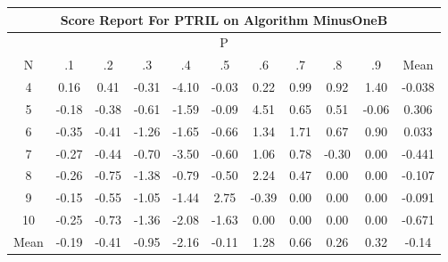 \documentclass[11pt,a4paper]{report}
\begin{document}
\begin{longtable}{ | c || c | c | c | c | c | c | c | c | c || c |}
\hline
\multicolumn{11}{|c|}{ Score Report For PTRIL on Algorithm MinusOneB} \\
\hline
\multicolumn{11}{|c|}{ P } \\
\hline
N & .1 & .2 & .3 & .4 & .5 & .6 & .7 & .8 & .9 & Mean\\
 \hline
 \hline
 \endhead
  4 &  \cellcolor[HTML]{FFFFFF} 0.16 &  \cellcolor[HTML]{F7F7FF} 0.41 &  \cellcolor[HTML]{FFF7F7} -0.31 &  \cellcolor[HTML]{FF9797} -4.10 &  \cellcolor[HTML]{FFFFFF} -0.03 &  \cellcolor[HTML]{F7F7FF} 0.22 &  \cellcolor[HTML]{E7E7FF} 0.99 &  \cellcolor[HTML]{E7E7FF} 0.92 &  \cellcolor[HTML]{DFDFFF} 1.40 & -0.038 \\
  5 &  \cellcolor[HTML]{FFF7F7} -0.18 &  \cellcolor[HTML]{FFF7F7} -0.38 &  \cellcolor[HTML]{FFEFEF} -0.61 &  \cellcolor[HTML]{FFD7D7} -1.59 &  \cellcolor[HTML]{FFFFFF} -0.09 &  \cellcolor[HTML]{8F8FFF} 4.51 &  \cellcolor[HTML]{EFEFFF} 0.65 &  \cellcolor[HTML]{EFEFFF} 0.51 &  \cellcolor[HTML]{FFFFFF} -0.06 & 0.306 \\
  6 &  \cellcolor[HTML]{FFF7F7} -0.35 &  \cellcolor[HTML]{FFF7F7} -0.41 &  \cellcolor[HTML]{FFDFDF} -1.26 &  \cellcolor[HTML]{FFD7D7} -1.65 &  \cellcolor[HTML]{FFEFEF} -0.66 &  \cellcolor[HTML]{DFDFFF} 1.34 &  \cellcolor[HTML]{D7D7FF} 1.71 &  \cellcolor[HTML]{EFEFFF} 0.67 &  \cellcolor[HTML]{E7E7FF} 0.90 & 0.033 \\
  7 &  \cellcolor[HTML]{FFF7F7} -0.27 &  \cellcolor[HTML]{FFF7F7} -0.44 &  \cellcolor[HTML]{FFEFEF} -0.70 &  \cellcolor[HTML]{FFA7A7} -3.50 &  \cellcolor[HTML]{FFEFEF} -0.60 &  \cellcolor[HTML]{E7E7FF} 1.06 &  \cellcolor[HTML]{EFEFFF} 0.78 &  \cellcolor[HTML]{FFF7F7} -0.30 &  \cellcolor[HTML]{FFFFFF} 0.00 & -0.441 \\
  8 &  \cellcolor[HTML]{FFF7F7} -0.26 &  \cellcolor[HTML]{FFEFEF} -0.75 &  \cellcolor[HTML]{FFDFDF} -1.38 &  \cellcolor[HTML]{FFEFEF} -0.79 &  \cellcolor[HTML]{FFEFEF} -0.50 &  \cellcolor[HTML]{C7C7FF} 2.24 &  \cellcolor[HTML]{F7F7FF} 0.47 &  \cellcolor[HTML]{FFFFFF} 0.00 &  \cellcolor[HTML]{FFFFFF} 0.00 & -0.107 \\
  9 &  \cellcolor[HTML]{FFFFFF} -0.15 &  \cellcolor[HTML]{FFEFEF} -0.55 &  \cellcolor[HTML]{FFE7E7} -1.05 &  \cellcolor[HTML]{FFD7D7} -1.44 &  \cellcolor[HTML]{B7B7FF} 2.75 &  \cellcolor[HTML]{FFF7F7} -0.39 &  \cellcolor[HTML]{FFFFFF} 0.00 &  \cellcolor[HTML]{FFFFFF} 0.00 &  \cellcolor[HTML]{FFFFFF} 0.00 & -0.091 \\
  10 &  \cellcolor[HTML]{FFF7F7} -0.25 &  \cellcolor[HTML]{FFEFEF} -0.73 &  \cellcolor[HTML]{FFDFDF} -1.36 &  \cellcolor[HTML]{FFC7C7} -2.08 &  \cellcolor[HTML]{FFD7D7} -1.63 &  \cellcolor[HTML]{FFFFFF} 0.00 &  \cellcolor[HTML]{FFFFFF} 0.00 &  \cellcolor[HTML]{FFFFFF} 0.00 &  \cellcolor[HTML]{FFFFFF} 0.00 & -0.671 \\
 \hline
 \hline
Mean &  \cellcolor[HTML]{FFF7F7} -0.19 &  \cellcolor[HTML]{FFF7F7} -0.41 &  \cellcolor[HTML]{FFE7E7} -0.95 &  \cellcolor[HTML]{FFC7C7} -2.16 &  \cellcolor[HTML]{FFFFFF} -0.11 &  \cellcolor[HTML]{DFDFFF} 1.28 &  \cellcolor[HTML]{EFEFFF} 0.66 &  \cellcolor[HTML]{F7F7FF} 0.26 &  \cellcolor[HTML]{F7F7FF} 0.32 &  \cellcolor[HTML]{FFFFFF} -0.14
\end{longtable}
\end{document}
